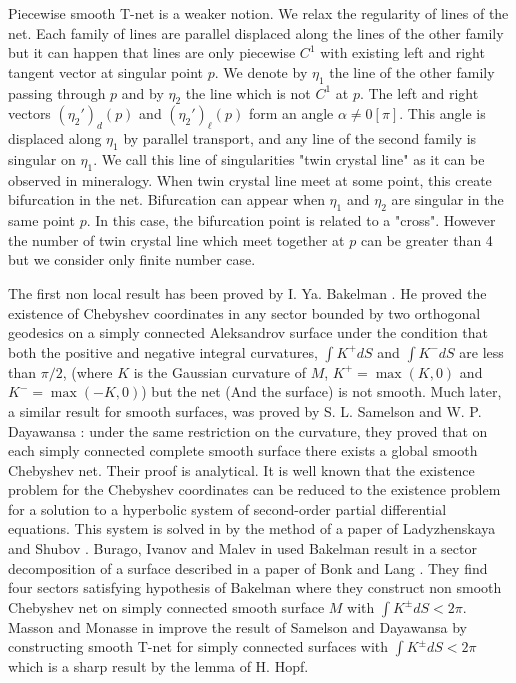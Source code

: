 \documentclass{article}
\newcommand{\surf}{M}
\theoremstyle{remark}
\theoremstyle{prpart}
\begin{document}
Piecewise smooth T-net is a weaker notion. We relax the regularity of lines of the net. Each family of lines are parallel displaced along the lines
of the other family but it can happen that lines are only piecewise $C^1$ with existing left and right tangent vector at singular point $p$.
We denote by $\eta_1$ the line of the other family passing through $p$ and by $\eta_2$ the line which is not $C^1$ at $p$. The left and right
vectors $(\eta_2 ')_d (p)$ and $(\eta_2 ')_\ell (p)$ form an angle $\alpha \neq 0 [\pi]$. This angle is displaced along $\eta_1$ by parallel transport, and any line
of the second family is singular on $\eta_1$. We call this line of singularities "twin crystal line" as it can be observed in mineralogy.
When twin crystal line meet at some point, this create bifurcation in the net. Bifurcation can appear when $\eta_1$ and $\eta_2$ are singular 
in the same point $p$. In this case, the bifurcation point is related to a "cross". However the number of twin crystal line which meet together at
 $p$ can be greater than 4 but we consider only finite number case.


 The first non local result has been proved by I. Ya. Bakelman \cite{Bak65}. He  proved the existence of Chebyshev coordinates in any sector bounded by two orthogonal geodesics on a
 simply connected Aleksandrov surface under the condition that both the positive and negative integral curvatures, $\int K^+ dS$ and $\int K^- dS$ are less than $\pi /2$,   (where $K$ is the Gaussian curvature of $\surf$, $K^+=\max(K,0)$ and $K^-=\max(-K,0)$) but the net (And the surface) is not smooth. Much later, a similar result for smooth surfaces, was proved by S. L. Samelson and W. P. Dayawansa \cite{SamDaya}: under the same restriction on the curvature, they proved that on each simply connected complete smooth surface there exists a global smooth Chebyshev net. Their proof is analytical. It is well known that the existence problem for the Chebyshev coordinates can be reduced to the existence problem for a solution to a hyperbolic system of second-order partial differential equations. This system is solved in \cite{SamDaya}  by the method of a paper of Ladyzhenskaya and Shubov  \cite{Ladishenkaya}. Burago, Ivanov and Malev in \cite{burago} used Bakelman result in a sector decomposition of a surface described in a paper of Bonk and Lang \cite{bonk}. They find four sectors satisfying hypothesis of Bakelman where they construct non smooth Chebyshev net on simply connected smooth surface $M$ with  $\int K^{\pm} dS <2\pi$. Masson and Monasse in \cite{massonMonasse} improve the result of Samelson and Dayawansa by constructing smooth T-net for simply connected surfaces with $\int K^{\pm} dS <2\pi$ which is a sharp result by the lemma of H. Hopf.
\end{document}
